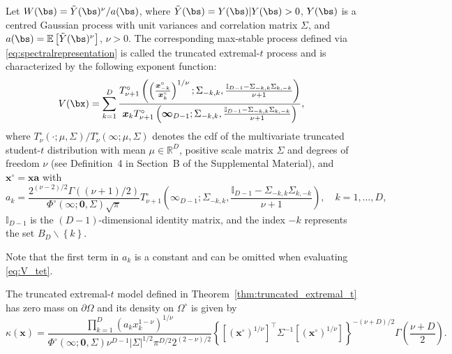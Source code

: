 \documentclass[12pt]{article}
\begin{document}
\begin{theorem}
\label{thm:truncated_extremal_t}   
Let $W(\bs) = \tilde{Y}(\bs)^\nu / a(\bs)$, where $\tilde{Y}(\bs) = Y(\bs)|Y(\bs)>0$, $Y(\bs)$ is a centred Gaussian process with unit variances and correlation matrix $\Sigma$, and $a(\bs) = \mathbb{E}\left[ \tilde{Y}(\bs)^\nu\right]$, $\nu>0$.
The corresponding max-stable process defined via \eqref{eq:spectralrepresentation} is called the truncated extremal-$t$ process and is characterized by the following exponent function:
%
\begin{equation}
\label{eq:V_tet}
V(\bx) = \sum_{k=1}^D \frac{T_{\nu+1}^\circ\left( \left(\frac{\bm x_{-k}^\circ}{\bm x_{k}^\circ}\right)^{1/\nu} ;\Sigma_{-k,k},\frac{\mathbb{I}_{D-1}-\Sigma_{-k,k}\Sigma_{k,-k} }{\nu+1}\right)}{\bm x_k T_{\nu+1}^\circ\left(\bm \infty_{D-1};\Sigma_{-k,k}, \frac{\mathbb{I}_{D-1}-\Sigma_{-k,k} \Sigma_{k,-k}}{\nu+1}\right)},
\end{equation}
%
where $T_{\nu}^\circ(\cdot; \mu, \Sigma) / T_{\nu}^\circ(\infty; \mu, \Sigma)$ denotes the cdf of the multivariate truncated student-$t$ distribution with mean $\mu \in \mathbb{R}^D$, positive scale matrix $\Sigma$ and degrees of freedom $\nu$ (see Definition~4 in Section~B of the Supplemental Material), and $\bm x^\circ = \bm x \bm a$ with
%
\begin{equation*}
a_k = \frac{2^{(\nu-2)/2}\Gamma((\nu+1)/2)}{\Phi^\circ(\bm \infty;\bm 0, \Sigma) \sqrt{\pi}} T_{\nu+1}^\circ\left(
\bm \infty_{D-1};
\Sigma_{-k,k}, \frac{\mathbb{I}_{D-1} -\Sigma_{-k,k} \Sigma_{k,-k}}{\nu+1} \right), \quad k=1,\dots,D,	    
\end{equation*}
%
$\mathbb{I}_{D-1}$ is the $(D-1)$-dimensional identity matrix, and the index $-k$ represents the set $B_D \backslash \left\{ k\right\}$.
%
\end{theorem}
%
Note that the first term in $a_k$ is a constant and can be omitted when evaluating \eqref{eq:V_tet}.
%
\begin{proposition}
\label{prop:AngDesn_eT}
The truncated extremal-$t$ model defined in Theorem~\ref{thm:truncated_extremal_t} has zero mass on $\partial\Omega$ and its density on $\Omega^\circ$ is given by
%
\begin{equation}
\label{eq:h_eT}
\kappa(\bm x) = \frac{\prod_{k=1}^D \left(a_k x_k^{1-\nu}\right)^{1/\nu}}{\Phi^\circ(\bm \infty;\bm 0, \Sigma) \nu^{D-1}|\Sigma|^{1/2}\pi^{D/2}2^{(2-\nu)/2}} \left\{\left[(\bm x^\circ)^{1/\nu}\right]^\top \Sigma^{-1}\left[(\bm x^\circ)^{1/\nu}\right]\right\}^{-(\nu+D)/2} \Gamma\left(\frac{\nu+D}{2}\right).
\end{equation}%
\end{proposition}
\end{document}
